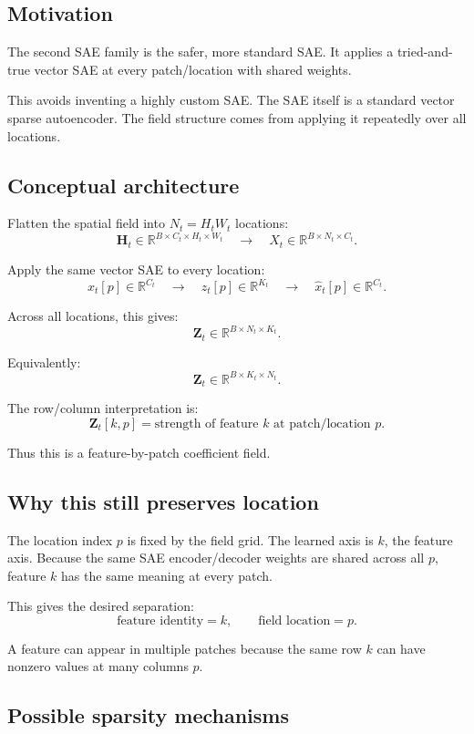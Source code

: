 \documentclass[11pt]{article}
\newcommand{\R}{\mathbb{R}}
\newcommand{\Htens}{\mathbf{H}}
\newcommand{\Ztens}{\mathbf{Z}}
\begin{document}
\subsection{Motivation}

The second SAE family is the safer, more standard SAE. It applies a tried-and-true vector SAE at every patch/location with shared weights.

This avoids inventing a highly custom SAE. The SAE itself is a standard vector sparse autoencoder. The field structure comes from applying it repeatedly over all locations.

\subsection{Conceptual architecture}

Flatten the spatial field into \(N_t = H_t W_t\) locations:
\[
\Htens_t \in \R^{B \times C_t \times H_t \times W_t}
\quad\longrightarrow\quad
X_t \in \R^{B \times N_t \times C_t}.
\]

Apply the same vector SAE to every location:
\[
x_t[p] \in \R^{C_t}
\quad\longrightarrow\quad
z_t[p] \in \R^{K_t}
\quad\longrightarrow\quad
\hat{x}_t[p] \in \R^{C_t}.
\]

Across all locations, this gives:
\[
\Ztens_t \in \R^{B \times N_t \times K_t}.
\]

Equivalently:
\[
\Ztens_t \in \R^{B \times K_t \times N_t}.
\]

The row/column interpretation is:
\[
\Ztens_t[k,p]
=
\text{strength of feature } k \text{ at patch/location } p.
\]

Thus this is a feature-by-patch coefficient field.

\subsection{Why this still preserves location}

The location index \(p\) is fixed by the field grid. The learned axis is \(k\), the feature axis. Because the same SAE encoder/decoder weights are shared across all \(p\), feature \(k\) has the same meaning at every patch.

This gives the desired separation:
\[
\text{feature identity} = k,
\qquad
\text{field location} = p.
\]

A feature can appear in multiple patches because the same row \(k\) can have nonzero values at many columns \(p\).

\subsection{Possible sparsity mechanisms}
\end{document}
